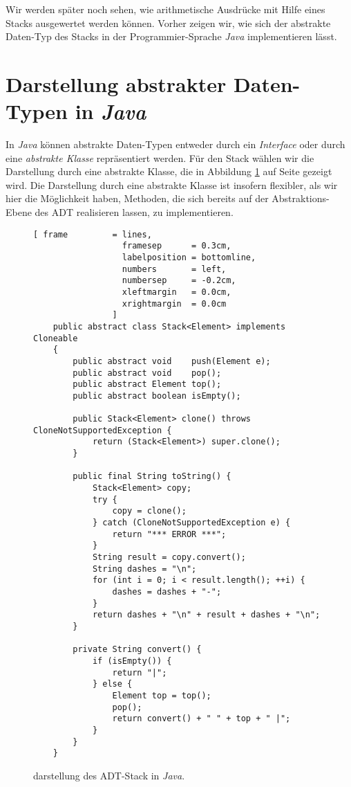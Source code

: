 Wir werden sp\"ater noch sehen, wie  arithmetische Ausdr\"ucke mit Hilfe
eines Stacks ausgewertet werden k\"onnen. Vorher zeigen wir, wie sich der
abstrakte Daten-Typ des Stacks in der Programmier-Sprache \textsl{Java}
implementieren l\"asst.

\section{Darstellung abstrakter Daten-Typen in \textsl{Java}}
In \textsl{Java} k\"onnen abstrakte Daten-Typen entweder durch ein \emph{Interface} oder
durch eine \emph{abstrakte Klasse} repr\"asentiert werden.   F\"ur den Stack w\"ahlen wir die Darstellung
durch eine abstrakte Klasse, die in Abbildung \ref{fig:stack.java} auf Seite
\pageref{fig:stack.java} gezeigt wird.   Die Darstellung durch eine abstrakte Klasse ist
insofern flexibler, als wir hier die M\"oglichkeit haben, Methoden, die sich
bereits auf der Abstraktions-Ebene des ADT realisieren lassen, zu implementieren.

\begin{figure}[!h]
  \centering
\begin{Verbatim}[ frame         = lines, 
                  framesep      = 0.3cm, 
                  labelposition = bottomline,
                  numbers       = left,
                  numbersep     = -0.2cm,
                  xleftmargin   = 0.0cm,
                  xrightmargin  = 0.0cm
                ]
    public abstract class Stack<Element> implements Cloneable
    {
        public abstract void    push(Element e);
        public abstract void    pop();
        public abstract Element top();
        public abstract boolean isEmpty();
    
        public Stack<Element> clone() throws CloneNotSupportedException {    
            return (Stack<Element>) super.clone();
        }

        public final String toString() {
            Stack<Element> copy;
            try {
                copy = clone();
            } catch (CloneNotSupportedException e) {
                return "*** ERROR ***";
            }       
            String result = copy.convert();
            String dashes = "\n";
            for (int i = 0; i < result.length(); ++i) {
                dashes = dashes + "-";
            }
            return dashes + "\n" + result + dashes + "\n";
        }
    
        private String convert() {
            if (isEmpty()) {
                return "|";
            } else {
                Element top = top();
                pop();
                return convert() + " " + top + " |";
            }
        }
    }
\end{Verbatim}
\vspace*{-0.3cm}
  \caption{darstellung des ADT-Stack in \textsl{Java}.}
  \label{fig:stack.java}
\end{figure} 

